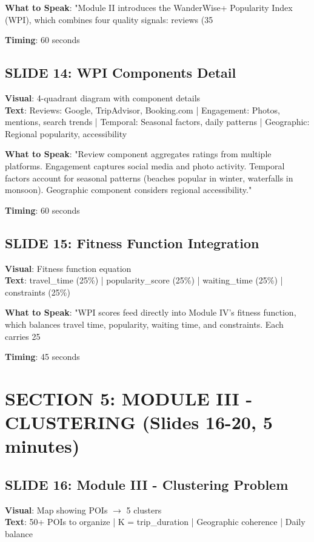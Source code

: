 \documentclass[12pt]{article}
\begin{document}
\textbf{What to Speak}:
"Module II introduces the WanderWise+ Popularity Index (WPI), which combines four quality signals: reviews (35%

\textbf{Timing}: 60 seconds

\subsection{SLIDE 14: WPI Components Detail}
\textbf{Visual}: 4-quadrant diagram with component details \\
\textbf{Text}: Reviews: Google, TripAdvisor, Booking.com | Engagement: Photos, mentions, search trends | Temporal: Seasonal factors, daily patterns | Geographic: Regional popularity, accessibility

\textbf{What to Speak}:
"Review component aggregates ratings from multiple platforms. Engagement captures social media and photo activity. Temporal factors account for seasonal patterns (beaches popular in winter, waterfalls in monsoon). Geographic component considers regional accessibility."

\textbf{Timing}: 60 seconds

\subsection{SLIDE 15: Fitness Function Integration}
\textbf{Visual}: Fitness function equation \\
\textbf{Text}: travel\_time (25\%) | popularity\_score (25\%) | waiting\_time (25\%) | constraints (25\%)

\textbf{What to Speak}:
"WPI scores feed directly into Module IV's fitness function, which balances travel time, popularity, waiting time, and constraints. Each carries 25%

\textbf{Timing}: 45 seconds

\section{SECTION 5: MODULE III - CLUSTERING (Slides 16-20, 5 minutes)}

\subsection{SLIDE 16: Module III - Clustering Problem}
\textbf{Visual}: Map showing POIs $\rightarrow$ 5 clusters \\
\textbf{Text}: 50+ POIs to organize | K = trip\_duration | Geographic coherence | Daily balance
\end{document}
